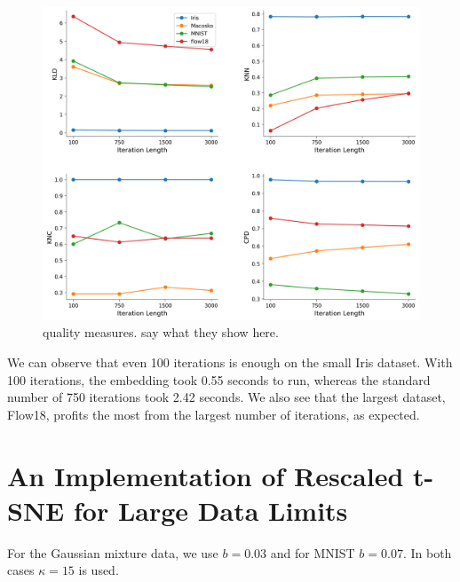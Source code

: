 \begin{figure}[h]
    \centering 
        \includegraphics[width=\linewidth]{figures/n_iter/n_iter_4_quality_measures.png}
        \caption{quality measures. say what they show here.}
    \label{fig:n_iter-quality}
\end{figure}

We can observe that even 100 iterations is enough on the small Iris dataset. 
With 100 iterations, the embedding took 0.55 seconds to run, whereas the standard number of 750 iterations took 2.42 seconds. 
We also see that the largest dataset, Flow18, profits the most from the largest number of iterations, as expected. 

\section{An Implementation of Rescaled t-SNE for Large Data Limits}
For the Gaussian mixture data, we use $b=0.03$ and for MNIST $b=0.07$. In both cases $\kappa=15$ is used. 

